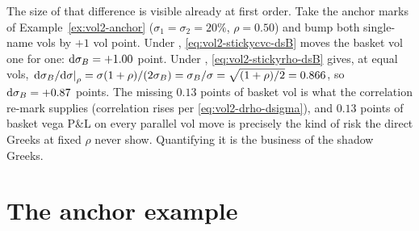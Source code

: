 The size of that difference is visible already at first order. Take the
anchor marks of Example~\ref{ex:vol2-anchor} ($\sigma_1 = \sigma_2 = 20\%$,
$\rho = 0.50$) and bump both single-name vols by $+1$ vol point. Under
\stickycvc, \eqref{eq:vol2-stickycvc-dsB} moves the basket vol one for one:
$\mathrm{d}\sigma_B = +1.00$ point. Under \stickyrho, \eqref{eq:vol2-stickyrho-dsB}
gives, at equal vols,
$\left.\mathrm{d}\sigma_B/\mathrm{d}\sigma\right|_{\rho} = \sigma(1+\rho)/(2\sigma_B) = \sigma_B/\sigma
 = \sqrt{(1+\rho)/2} = 0.866$,
so $\mathrm{d}\sigma_B = +0.87$ points. The missing $0.13$ points of basket vol is what
the \stickycvc{} correlation re-mark supplies (correlation rises per
\eqref{eq:vol2-drho-dsigma}), and $0.13$ points of basket vega P\&L on
every parallel vol move is precisely the kind of risk the direct Greeks at
fixed $\rho$ never show. Quantifying it is the business of the shadow
Greeks.

\section{The anchor example}
\label{sec:vol2-anchor}

